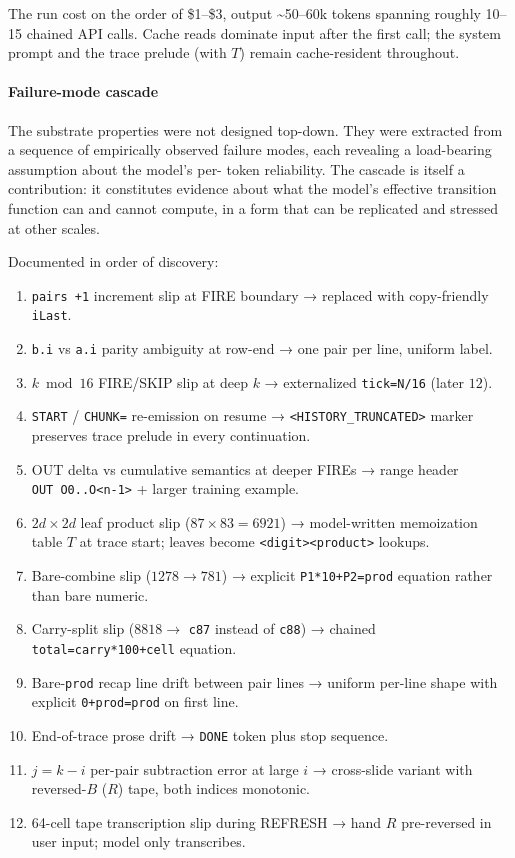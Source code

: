 \documentclass[twocolumn,switch,10pt]{article}
\providecommand{\tightlist}{\setlength{\itemsep}{0pt}\setlength{\parskip}{0pt}}
\begin{document}
The run cost on the order of \$1--\$3, output \textasciitilde50--60k tokens
spanning roughly 10--15 chained API calls. Cache reads dominate input
after the first call; the system prompt and the trace prelude (with
\(T\)) remain cache-resident throughout.

\paragraph{Failure-mode cascade}\label{failure-mode-cascade}

The substrate properties were not designed top-down. They were
extracted from a sequence of empirically observed failure modes,
each revealing a load-bearing assumption about the model's per-
token reliability. The cascade is itself a contribution: it
constitutes evidence about what the model's effective transition
function can and cannot compute, in a form that can be replicated
and stressed at other scales.

Documented in order of discovery:

\begin{enumerate}
\def\labelenumi{\arabic{enumi}.}
\tightlist
\item
  \texttt{pairs\ +1} increment slip at FIRE boundary → replaced with
  copy-friendly \texttt{iLast}.
\item
  \texttt{b.i} vs \texttt{a.i} parity ambiguity at row-end → one pair per line,
  uniform label.
\item
  \(k \bmod 16\) FIRE/SKIP slip at deep \(k\) → externalized
  \texttt{tick=N/16} (later \(12\)).
\item
  \texttt{START} / \texttt{CHUNK=} re-emission on resume → \texttt{\textless{}HISTORY\_TRUNCATED\textgreater{}}
  marker preserves trace prelude in every continuation.
\item
  OUT delta vs cumulative semantics at deeper FIREs → range header
  \texttt{OUT\ O0..O\textless{}n-1\textgreater{}} + larger training example.
\item
  \(2d \times 2d\) leaf product slip (\(87 \times 83 = 6921\)) →
  model-written memoization table \(T\) at trace start; leaves
  become \texttt{\textless{}digit\textgreater{}\textbar{}\textless{}product\textgreater{}} lookups.
\item
  Bare-combine slip (\(1278 \to 781\)) → explicit
  \texttt{P1*10+P2=prod} equation rather than bare numeric.
\item
  Carry-split slip (\(8818 \to\) \texttt{c87} instead of \texttt{c88}) → chained
  \texttt{total=carry*100+cell} equation.
\item
  Bare-\texttt{prod} recap line drift between pair lines → uniform
  per-line shape with explicit \texttt{0+prod=prod} on first line.
\item
  End-of-trace prose drift → \texttt{DONE} token plus stop sequence.
\item
  \(j = k - i\) per-pair subtraction error at large \(i\) →
  cross-slide variant with reversed-\(B\) (\(R\)) tape, both indices
  monotonic.
\item
  64-cell tape transcription slip during REFRESH → hand \(R\)
  pre-reversed in user input; model only transcribes.
\end{enumerate}
\end{document}
